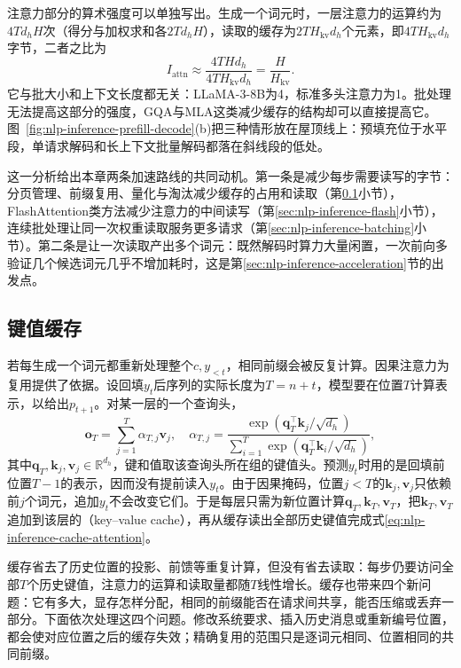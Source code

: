 注意力部分的算术强度可以单独写出。生成一个词元时，一层注意力的运算约为$4Td_hH$次（得分与加权求和各$2Td_hH$），读取的缓存为$2TH_{\mathrm{kv}}d_h$个元素，即$4TH_{\mathrm{kv}}d_h$字节，二者之比为
\begin{equation}
 I_{\mathrm{attn}}\approx\frac{4THd_h}{4TH_{\mathrm{kv}}d_h}=\frac{H}{H_{\mathrm{kv}}}.
 \label{eq:nlp-inference-attention-intensity}
\end{equation}
它与批大小和上下文长度都无关：LLaMA-3-8B为4，标准多头注意力为1。批处理无法提高这部分的强度，GQA与MLA这类减少缓存的结构却可以直接提高它。图~\ref{fig:nlp-inference-prefill-decode}(b)把三种情形放在屋顶线上：预填充位于水平段，单请求解码和长上下文批量解码都落在斜线段的低处。

这一分析给出本章两条加速路线的共同动机。第一条是减少每步需要读写的字节：分页管理、前缀复用、量化与淘汰减少缓存的占用和读取（第\ref{sec:nlp-inference-cache}小节），FlashAttention类方法减少注意力的中间读写（第\ref{sec:nlp-inference-flash}小节），连续批处理让同一次权重读取服务更多请求（第\ref{sec:nlp-inference-batching}小节）。第二条是让一次读取产出多个词元：既然解码时算力大量闲置，一次前向多验证几个候选词元几乎不增加耗时，这是第\ref{sec:nlp-inference-acceleration}节的出发点。

\subsection{键值缓存}
\label{sec:nlp-inference-cache}

若每生成一个词元都重新处理整个$c,y_{<t}$，相同前缀会被反复计算。因果注意力为复用提供了依据。设回填$y_t$后序列的实际长度为$T=n+t$，模型要在位置$T$计算表示，以给出$p_{t+1}$。对某一层的一个查询头，
\begin{equation}
 \bm{o}_T=\sum_{j=1}^{T}\alpha_{T,j}\bm{v}_j,
 \quad
 \alpha_{T,j}=\frac{\exp(\bm{q}_T^{\top}\bm{k}_j/\sqrt{d_h})}
 {\sum_{i=1}^{T}\exp(\bm{q}_T^{\top}\bm{k}_i/\sqrt{d_h})},
 \label{eq:nlp-inference-cache-attention}
\end{equation}
其中$\bm{q}_T,\bm{k}_j,\bm{v}_j\in\mathbb{R}^{d_h}$，键和值取该查询头所在组的键值头。预测$y_t$时用的是回填前位置$T-1$的表示，因而没有提前读入$y_t$。由于因果掩码，位置$j<T$的$\bm k_j,\bm v_j$只依赖前$j$个词元，追加$y_t$不会改变它们。于是每层只需为新位置计算$\bm q_T,\bm k_T,\bm v_T$，把$\bm k_T,\bm v_T$追加到该层的（key--value cache），再从缓存读出全部历史键值完成式\eqref{eq:nlp-inference-cache-attention}。

缓存省去了历史位置的投影、前馈等重复计算，但没有省去读取：每步仍要访问全部$T$个历史键值，注意力的运算和读取量都随$T$线性增长。缓存也带来四个新问题：它有多大，显存怎样分配，相同的前缀能否在请求间共享，能否压缩或丢弃一部分。下面依次处理这四个问题。修改系统要求、插入历史消息或重新编号位置，都会使对应位置之后的缓存失效；精确复用的范围只是逐词元相同、位置相同的共同前缀。

